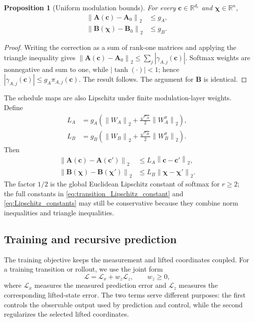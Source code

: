 \documentclass[journal]{IEEEtran}
\newtheorem{proposition}{Proposition}
\newcommand{\vc}{\mathbf{c}}
\newcommand{\vchi}{\boldsymbol{\chi}}
\newcommand{\mA}{\mathbf{A}}
\newcommand{\mB}{\mathbf{B}}
\newcommand{\R}{\mathbb{R}}
\newcommand{\norm}[1]{\left\lVert #1\right\rVert}
\begin{document}
\begin{proposition}[Uniform modulation bounds]
\label{prop:modulation_bound}
For every $\vc\in\R^{d_c}$ and $\vchi\in\R^n$,
\begin{equation}
    \begin{aligned}
    \norm{\mA(\vc)-\mA_0}_2&\le g_A,\\
    \norm{\mB(\vchi)-\mB_0}_2&\le g_B.
    \end{aligned}
    \label{eq:modulation_bound}
\end{equation}
\end{proposition}
\begin{proof}
Writing the correction as a sum of rank-one matrices and applying the triangle inequality gives
$\norm{\mA(\vc)-\mA_0}_2\le\sum_j|\gamma_{A,j}(\vc)|$. Softmax weights are nonnegative and sum to one, while $|\tanh(\cdot)|<1$; hence $|\gamma_{A,j}(\vc)|\le g_A\pi_{A,j}(\vc)$. The result follows. The argument for $\mB$ is identical.
\end{proof}

The schedule maps are also Lipschitz under finite modulation-layer weights. Define
\begin{align}
    L_A&=g_A\left(\norm{W_A}_2+\frac{\sqrt{r_A}}{2}\norm{W_A^\pi}_2\right),
    \label{eq:transition_Lipschitz_constant}\\
    L_B&=g_B\left(\norm{W_B}_2+\frac{\sqrt{r_B}}{2}\norm{W_B^\pi}_2\right).
    \label{eq:Lipschitz_constants}
\end{align}
Then
\begin{equation}
    \begin{aligned}
    \norm{\mA(\vc)-\mA(\vc')}_2&\le L_A\norm{\vc-\vc'}_2,\\
    \norm{\mB(\vchi)-\mB(\vchi')}_2&\le L_B\norm{\vchi-\vchi'}_2.
    \end{aligned}
    \label{eq:schedule_lipschitz}
\end{equation}
The factor $1/2$ is the global Euclidean Lipschitz constant of softmax for $r\ge2$; the full constants in \eqref{eq:transition_Lipschitz_constant} and \eqref{eq:Lipschitz_constants} may still be conservative because they combine norm inequalities and triangle inequalities.

\subsection{Training and recursive prediction}

The training objective keeps the measurement and lifted coordinates coupled. For a training transition or rollout, we use the joint form
\begin{equation}
    \mathcal L=\mathcal L_x+w_z\mathcal L_z,
    \qquad w_z\ge0,
    \label{eq:joint_training_loss}
\end{equation}
where $\mathcal L_x$ measures the measured prediction error and $\mathcal L_z$ measures the corresponding lifted-state error. The two terms serve different purposes: the first controls the observable output used by prediction and control, while the second regularizes the selected lifted coordinates.
\end{document}
